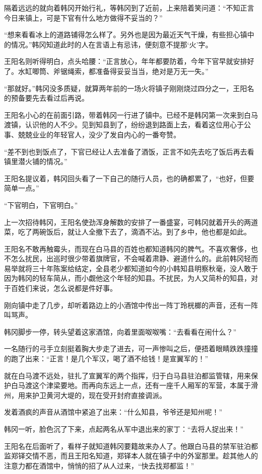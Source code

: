 隔着远远的就向着韩冈开始行礼，等韩冈到了近前，上来陪着笑问道：“不知正言今日来镇上，可是下官有什么地方做得不妥当的？”

“想来看看冰上的道路铺得怎么样了。另外也是因为最近天气干燥，有些担心镇中的情况。”韩冈知道此时的人在言语上有忌讳，便刻意不提那‘火’字。

王阳名则听得明白，点头哈腰：“正言放心，年年都要防着，今年下官早就安排好了。水缸唧筒、斧锯绳索，都准备得妥妥当当，绝对是万无一失。”

“那就好。”韩冈没多质疑，就算两年前的一场火将镇子刚刚烧过四分之一，王阳名的预备要先去看过后再说。

王阳名小心的在前面引路，带着韩冈一行进了镇中。已经不是韩冈第一次来到白马渡镇，认识他的人不少。见到知县到了，纷纷退到路面上去，看着这位用心于公事、兢兢业业的年轻官人，没少了发自内心的一番夸赞。

“差不到也到饭点了，下官已经让人去准备了酒饭，正言不如先去吃了饭后再去看镇里潜火铺的情况。”

王阳名提议着，韩冈回头看了一下自己的随行人员，也的确都累了，“也好，但要简单一点。”

“下官明白，下官明白。”

上一次招待韩冈，王阳名使劲浑身解数的安排了一番盛宴，可韩冈就着开头的两道菜，吃了两碗饭后，就让人全撤下去了，滴酒不沾。到了乡中，他也都是如此。

王阳名不敢再触霉头，而现在白马县的百姓也都知道韩冈的脾气。不喜欢奢侈，也不怎么扰民，出巡时很少带着旗牌官，不会喊着肃静、避道什么的。此前韩冈轻而易举就将三十年陈案给结定，全县老少都知道如今的小韩知县明察秋毫，没人敢于因为韩冈的轻车简从，而小觑他这个年轻的知县。不扰民，为人又简朴的知县，对于百姓们来说，怎么说都是件好事。

刚向镇中走了几步，却听着路边上的小酒馆中传出一阵丁玲桄榔的声音，还有一阵叫骂声。

韩冈脚步一停，转头望着这家酒馆，向着里面呶呶嘴：“去看看在闹什么？”

一名随行的弓手立刻挺着胸大步走了进去，可一声惨叫之后，便捂着眼睛跌跌撞撞的跑了出来：“正言！是几个军汉，喝了酒不给钱！是宣翼军的！”

就在白马渡不远处，驻扎了宣翼军的两个指挥，归于白马县驻泊都监管辖，用来保护白马渡这个津梁要地。而再向东远上一点，还有一座千人厢军的军营，本属于滑州，用来护卫黄河大堤的，现在受开封府直接调派。

发着酒疯的声音从酒馆中紧追了出来：“什么知县，爷爷还是知州呢！”

韩冈一听，脸色沉了下来，点起两名从军中退出来的家丁：“去将人捉出来！”

王阳名在后面听了，看样子就知道韩冈要籍故来办人了。他跟白马县的禁军驻泊都监郑铎交情不恶，而且王阳名知道，郑铎本人就在镇子中的外室那里。趁其他人的注意力都在酒馆中，悄悄的招了从人过来，“快去找郑都监！”

